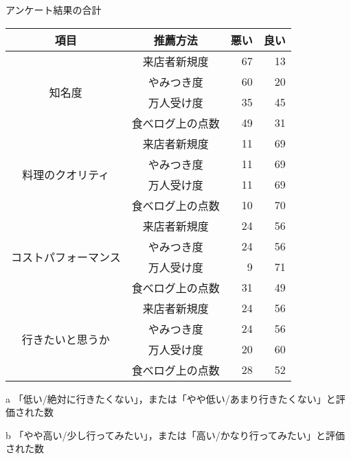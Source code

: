 \begin{center}
\begin{threeparttable}[H]
\caption{アンケート結果の合計}
\label{table:questionnaire:sum}
\small
\begin{tabular}{|c|c|r|r|}
\hline
項目 & 推薦方法 & 悪い\tnote{a} & 良い\tnote{b} \\ \hline
\multirow{4}{*}{知名度} & 来店者新規度 & 67 & 13 \\ \cline{2-4}
 & やみつき度 & 60 & 20 \\ \cline{2-4}
 & 万人受け度 & 35 & 45 \\ \cline{2-4}
 & 食べログ上の点数 & 49 & 31 \\ \hline
\multirow{4}{*}{料理のクオリティ} & 来店者新規度 & 11 & 69 \\ \cline{2-4}
 & やみつき度 & 11 & 69 \\ \cline{2-4}
 & 万人受け度 & 11 & 69 \\ \cline{2-4}
 & 食べログ上の点数 & 10 & 70 \\ \hline
\multirow{4}{*}{コストパフォーマンス} & 来店者新規度 & 24 & 56 \\ \cline{2-4}
 & やみつき度 & 24 & 56 \\ \cline{2-4}
 & 万人受け度 & 9 & 71 \\ \cline{2-4}
 & 食べログ上の点数 & 31 & 49 \\ \hline
\multirow{4}{*}{行きたいと思うか} & 来店者新規度 & 24 & 56 \\ \cline{2-4}
 & やみつき度 & 24 & 56 \\ \cline{2-4}
 & 万人受け度 & 20 & 60 \\ \cline{2-4}
 & 食べログ上の点数 & 28 & 52 \\ \hline
\end{tabular}
\begin{tablenotes}
\item[a] 「低い/絶対に行きたくない」，または「やや低い/あまり行きたくない」と評価された数
\item[b] 「やや高い/少し行ってみたい」，または「高い/かなり行ってみたい」と評価された数
\end{tablenotes}
\end{threeparttable}
\end{center}
